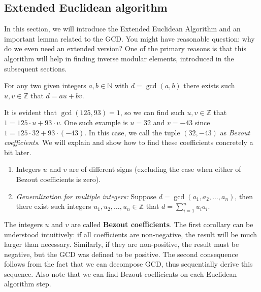 \documentclass[../../book.tex]{subfiles}
\begin{document}
\subsection{Extended Euclidean algorithm}

In this section, we will introduce the Extended Euclidean Algorithm and an
important lemma related to the GCD. You might have reasonable question: why do
we even need an extended version? One of the primary reasons is that this 
algorithm will help in finding inverse modular elements, introduced in the 
subsequent sections.

\begin{lemma}  \label{lemma:bezout_identity}
    For any two given integers $a, b \in \mathbb{N}$ with $d = \gcd(a, b)$ there exists such 
    $u, v \in \mathbb{Z}$ that $d = au + bv$.
\end{lemma}

\begin{example}
    It is evident that $\gcd(125, 93) = 1$, so we can find such $u, v \in
    \mathbb{Z}$ that $1 = 125 \cdot u + 93 \cdot v$. One such example is $u =
    32$ and $v = -43$ since $1 = 125 \cdot 32 + 93 \cdot (-43)$. In this case,
    we call the tuple $(32,-43)$ as \textit{Bezout coefficients}. We will explain and show
    how to find these coefficients concretely a bit later.
\end{example}

\begin{corollary} 
    \hfill
    \begin{enumerate}
        \item Integers $u$ and $v$ are of different signs (excluding the case when either of Bezout coefficients is zero).
        \item \textit{Generalization for multiple integers:} Suppose $d = \gcd(a_1, a_2, \dots, a_n)$, then there 
        exist such integers $u_1, u_2, \dots, u_n \in \mathbb{Z}$ that $d = \sum_{i=1}^nu_ia_i$.
    \end{enumerate}    
\end{corollary}

The integers $u$ and $v$ are called \textbf{Bezout coefficients}. The first
corollary can be understood intuitively: if all coefficients are non-negative,
the result will be much larger than necessary. Similarly, if they are
non-positive, the result must be negative, but the GCD was defined to be
positive. The second consequence follows from the fact that we can decompose
GCD, thus sequentially derive this sequence. Also note that we can find Bezout
coefficients on each Euclidean algorithm step.
\end{document}
